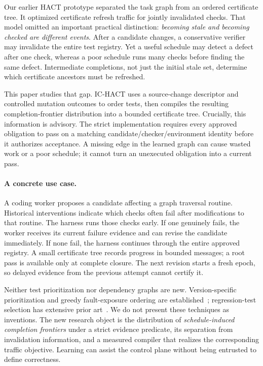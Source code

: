 \documentclass[11pt]{article}
\theoremstyle{definition}\newtheorem{definition}[theorem]{Definition}
\theoremstyle{remark}\newtheorem{remark}[theorem]{Remark}
\begin{document}
Our earlier HACT prototype separated the task graph from an ordered certificate tree. It optimized certificate refresh traffic for jointly invalidated checks. That model omitted an important practical distinction: \emph{becoming stale and becoming checked are different events}. After a candidate changes, a conservative verifier may invalidate the entire test registry. Yet a useful schedule may detect a defect after one check, whereas a poor schedule runs many checks before finding the same defect. Intermediate completions, not just the initial stale set, determine which certificate ancestors must be refreshed.

This paper studies that gap. IC-HACT uses a source-change descriptor and controlled mutation outcomes to order tests, then compiles the resulting completion-frontier distribution into a bounded certificate tree. Crucially, this information is advisory. The strict implementation requires every approved obligation to pass on a matching candidate/checker/environment identity before it authorizes acceptance. A missing edge in the learned graph can cause wasted work or a poor schedule; it cannot turn an unexecuted obligation into a current pass.

\paragraph{A concrete use case.}
A coding worker proposes a candidate affecting a graph traversal routine. Historical interventions indicate which checks often fail after modifications to that routine. The harness runs those checks early. If one genuinely fails, the worker receives its current failure evidence and can revise the candidate immediately. If none fail, the harness continues through the entire approved registry. A small certificate tree records progress in bounded messages; a root pass is available only at complete closure. The next revision starts a fresh epoch, so delayed evidence from the previous attempt cannot certify it.

Neither test prioritization nor dependency graphs are new. Version-specific prioritization and greedy fault-exposure ordering are established~\cite{rothermel}; regression-test selection has extensive prior art~\cite{ekstazi,namerts}. We do not present these techniques as inventions. The new research object is the distribution of \emph{schedule-induced completion frontiers} under a strict evidence predicate, its separation from invalidation information, and a measured compiler that realizes the corresponding traffic objective. Learning can assist the control plane without being entrusted to define correctness.
\end{document}
